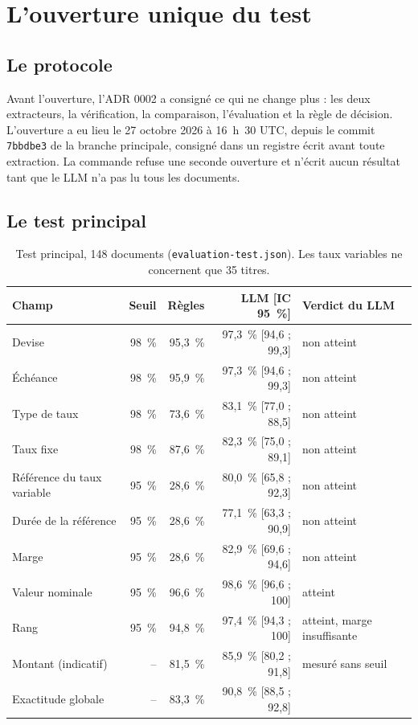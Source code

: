 \documentclass[11pt,a4paper]{article}
\begin{document}
\section{L'ouverture unique du test}

\subsection{Le protocole}

Avant l'ouverture, l'ADR 0002 a consigné ce qui ne change plus : les deux extracteurs, la vérification, la comparaison, l'évaluation et la règle de décision. L'ouverture a eu lieu le 27 octobre 2026 à 16~h~30 UTC, depuis le commit \texttt{7bbdbe3} de la branche principale, consigné dans un registre écrit avant toute extraction. La commande refuse une seconde ouverture et n'écrit aucun résultat tant que le LLM n'a pas lu tous les documents.

\subsection{Le test principal}

\begin{table}[H]
\small
\begin{tabularx}{\linewidth}{Yrrrl}
\toprule
\textbf{Champ} & \textbf{Seuil} & \textbf{Règles} & \textbf{LLM [IC 95~\%]} & \textbf{Verdict du LLM} \\
\midrule
Devise & 98~\% & 95,3~\% & 97,3~\% [94,6 ; 99,3] & non atteint \\
Échéance & 98~\% & 95,9~\% & 97,3~\% [94,6 ; 99,3] & non atteint \\
Type de taux & 98~\% & 73,6~\% & 83,1~\% [77,0 ; 88,5] & non atteint \\
Taux fixe & 98~\% & 87,6~\% & 82,3~\% [75,0 ; 89,1] & non atteint \\
Référence du taux variable & 95~\% & 28,6~\% & 80,0~\% [65,8 ; 92,3] & non atteint \\
Durée de la référence & 95~\% & 28,6~\% & 77,1~\% [63,3 ; 90,9] & non atteint \\
Marge & 95~\% & 28,6~\% & 82,9~\% [69,6 ; 94,6] & non atteint \\
Valeur nominale & 95~\% & 96,6~\% & 98,6~\% [96,6 ; 100] & atteint \\
Rang & 95~\% & 94,8~\% & 97,4~\% [94,3 ; 100] & atteint, marge insuffisante \\
Montant (indicatif) & -- & 81,5~\% & 85,9~\% [80,2 ; 91,8] & mesuré sans seuil \\
\midrule
Exactitude globale & -- & 83,3~\% & 90,8~\% [88,5 ; 92,8] & \\
\bottomrule
\end{tabularx}
\caption{Test principal, 148 documents (\texttt{evaluation-test.json}). Les taux variables ne concernent que 35 titres.}
\end{table}
\end{document}
